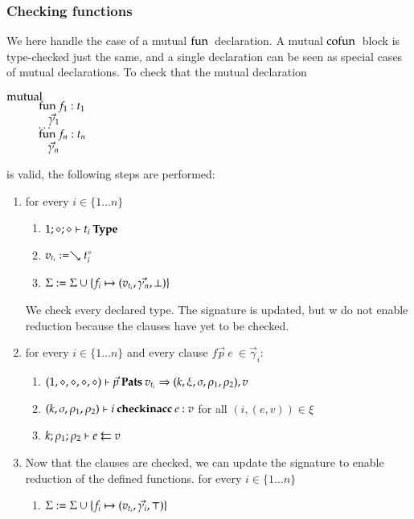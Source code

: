 \subsubsection{Checking functions}
We here handle the case of a mutual $\fun$ declaration.
A mutual $\cofun$ block is type-checked just the same,
and a single declaration can be seen as special cases of mutual declarations.
To check that the mutual declaration
\begin{bsp}
$\mutual$\\
$\spcx \fun f_1 : t_1 $\\
$\spcx \spc \vec{\gamma}_1$\\
$\spcx \ldots$\\
$\spcx \fun f_n : t_n $\\
$\spcx \spc \vec{\gamma}_n$\\
\end{bsp}
is valid, the following steps are performed:
\begin{enumerate}
\item
for every $i \in \{1 \ldots n \} $
\begin{enumerate}
\item
$\IsType{1}{\diamond}{\diamond}{t_i}$
\item
$v_{t_i} := \wh \cl{t_i}{\diamond}$
\item
$\Sig := \Sig \cup \{f_i \mapsto (v_{t_i},\vec{\gamma_n},\bot)\}$
\end{enumerate}
We check every declared type. The signature is updated, 
but w do not enable reduction because the clauses have yet to be checked. 
\item
for every $i \in \{ 1 \ldots n \} $ and every clause  $ f \vec{p} \: e \: \in \vec{\gamma}_i$:
\begin{enumerate}
\item
$\checkps{1,\diamond,\diamond,\diamond,\diamond}{\vec{p}}{v_{t_i}}{k,\xi,\sigma,\rho_1,\rho_2}{v}$
\item
$\checkinacc{k,\sigma,\rho_1,\rho_2}{i}{e}{v}$ for all $(i,(e,v)) \in \xi$ 
\item 
$\Check{k}{\rho_1}{\rho_2}{e}{v}$
\end{enumerate}
\item
Now that the clauses are checked, we can update the signature to enable reduction of the defined functions.
for every $i \in \{ 1 \ldots n \} $
\begin{enumerate}
\item
$\Sig := \Sig \cup \{f_i \mapsto (v_{t_i},\vec{\gamma_i},\top)\}$
\end{enumerate}
\end{enumerate}


